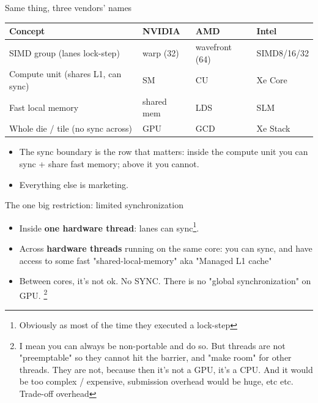 \begin{frame}{Same thing, three vendors' names}

\begin{center}
\begin{tabular}{@{}llll@{}}
\toprule
\textbf{Concept} & \textbf{NVIDIA} & \textbf{AMD} & \textbf{Intel} \\
\midrule
SIMD group (lanes lock-step) & warp (32) & wavefront (64) & SIMD8/16/32 \\
\alert{Compute unit} (shares L1, \alert{can sync}) & SM & CU & Xe Core \\
Fast local memory            & shared mem & LDS & SLM \\
Whole die / tile (\alert{no sync across}) & GPU & GCD & Xe Stack \\
\bottomrule
\end{tabular}
\end{center}
\medskip
\begin{itemize}
    \item The \alert{sync boundary} is the row that matters: inside the compute
          unit you can sync + share fast memory; above it you cannot.
    \item Everything else is marketing.
\end{itemize}
\end{frame}
\begin{frame}{The one big restriction: limited synchronization}
\begin{itemize}
    \item Inside \textbf{one hardware thread}: lanes can
          sync\footnote{Obviously as most of the time they executed a lock-step}. 
    \item Across \textbf{hardware threads} running on the same core: you can sync, and have access to some fast "shared-local-memory" aka "Managed L1 cache"
    \item Between cores, it's not ok. No SYNC. There is no "global synchronization" on GPU. \footnote{I mean you can always be non-portable and do so. But threads are not "preemptable" so they cannot hit the barrier, and "make room" for other threads. They are not, because then it's not a GPU, it's a CPU. And it would be too complex / expensive, submission overhead would be huge, etc etc. Trade-off overhead}
\end{itemize}
\end{frame}

